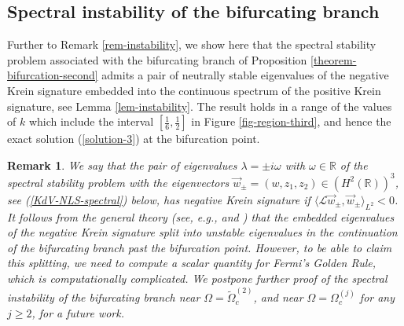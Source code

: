 \documentclass[12pt,reqno]{amsart}
\numberwithin{equation}{section}
\newtheorem{remark}{Remark}
\begin{document}
\subsection{Spectral instability of the bifurcating branch}

Further to Remark \ref{rem-instability}, we show here that the spectral 
stability problem associated with the bifurcating branch of Proposition \ref{theorem-bifurcation-second} admits a pair of neutrally stable eigenvalues of 
the negative Krein signature embedded into the continuous spectrum 
of the positive Krein signature, see Lemma \ref{lem-instability}. 
The result holds in a range of the values of $k$ which include the interval $\left[ \frac{1}{6},\frac{1}{2}\right]$ in Figure \ref{fig-region-third}, and hence 
the exact solution (\ref{solution-3}) at the bifurcation point. 

\begin{remark}
	We say that the pair of eigenvalues $\lambda = \pm i \omega$ with $\omega \in \mathbb{R}$ of the spectral stability problem with the eigenvectors 
	$\vec{w}_{\pm} = (w,z_1,z_2) \in (H^2(\mathbb{R}))^3$, see (\ref{KdV-NLS-spectral}) below, has negative Krein signature if 
	$\langle \mathcal{L} \vec{w}_{\pm}, \vec{w}_{\pm} \rangle_{L^2} < 0$. It follows from the general theory (see, e.g., \cite{G90} and \cite{CPV05}) that the embedded eigenvalues of the negative Krein signature split into unstable eigenvalues in the continuation of the bifurcating branch past the bifurcation point. However, to be able to claim this splitting, we need to compute a scalar quantity for Fermi's Golden Rule, which is computationally complicated. We postpone further proof of the spectral instability of the bifurcating  branch near $\Omega = \widetilde{\Omega}_c^{(2)}$, and near $\Omega = \Omega_c^{(j)}$ for any $j \geq 2$, for a future work.
\end{remark}
\end{document}
